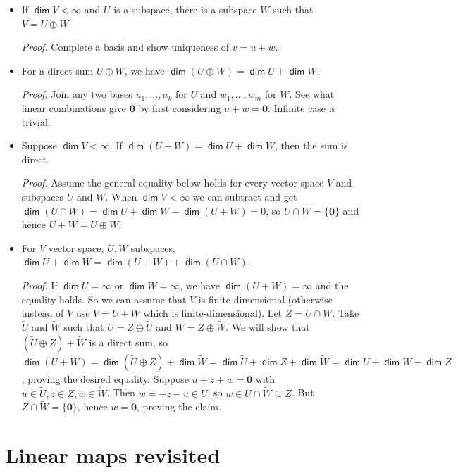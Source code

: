 \documentclass[11pt]{article}
\newcommand{\1}{\mathbf{1}}
\newcommand{\0}{\mathbf{0}}
\DeclareMathOperator{\mydim}{\mathsf{dim}}
\newcommand{\spitem}{\item[$\circ$]}
\begin{document}
\begin{itemize}
\item

If $\mydim V < \infty$ and $U$ is a subspace, there is a subspace $W$ such that $V = U \oplus W$.

\emph{Proof.}
Complete a basis and show uniqueness of $v = u+w$.

\spitem

For a direct sum $U \oplus W$, we have $\mydim(U \oplus W) = \mydim U + \mydim W$.

\emph{Proof.}
Join any two bases $u_1,\dots,u_k$ for $U$ and $w_1,\dots,w_m$ for $W$. See what linear combinations give $\0$ by first considering $u + w = \0$. Infinite case is trivial.

\spitem

Suppose $\mydim V<\infty$. If $\mydim(U+W) = \mydim U + \mydim W$, then the sum is direct.

\emph{Proof.}
Assume the general equality below holds for every vector space $V$ and subspaces $U$ and $W$.
When $\mydim V < \infty$ we can subtract and get $\mydim(U \cap W) = \mydim U + \mydim W - \mydim (U+W) = 0$, so $U \cap W = \{\0\}$ and hence $U+W = U \oplus W$.

\spitem
For $V$ vector space, $U,W$ subspaces, $\mydim U + \mydim W = \mydim (U+W) + \mydim (U \cap W)$.

\emph{Proof.}
If $\mydim U = \infty$ or $\mydim W = \infty$, we have $\mydim (U+W) = \infty$ and the equality holds. So we can assume that $V$ is finite-dimensional (otherwise instead of $V$ use $\tilde{V}=U+W$ which is finite-dimensional). Let $Z = U \cap W$. Take $\tilde{U}$ and $\tilde{W}$ such that $U=Z \oplus \tilde{U}$ and $W=Z \oplus \tilde{W}$. We will show that $(\tilde{U}\oplus Z)+ \tilde{W}$ is a direct sum, so $\mydim(U+W) = \mydim (\tilde{U} \oplus Z) + \mydim \tilde{W} = \mydim \tilde{U} + \mydim Z + \mydim \tilde{W} = \mydim U + \mydim W - \mydim Z$, proving the desired equality. Suppose $u+z+w=\0$ with $u \in \tilde{U}, z\in Z, w\in \tilde{W}$. Then $w = -z-u \in U$, so $w \in U \cap \tilde{W} \subseteq Z$. But $Z \cap \tilde{W} = \{\0\}$, hence $w = \0$, proving the claim.


\end{itemize}


\clearpage
\section{Linear maps revisited}
\end{document}
